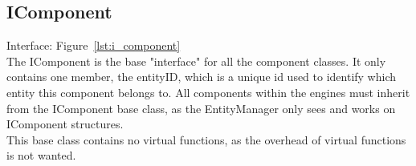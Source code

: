 \subsection{IComponent}
Interface: Figure~\ref{lst:i_component}\\\noindent
The IComponent is the base "interface" for all the component classes. 
It only contains one member, the entityID, which is a unique id used to identify which entity this component belongs to.
All components within the engines must inherit from the IComponent base class, as the EntityManager only sees and works on IComponent structures.\\
This base class contains no virtual functions, as the overhead of virtual functions is not wanted.
